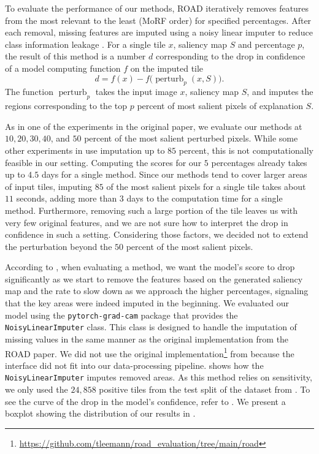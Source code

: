 To evaluate the performance of our methods, ROAD iteratively removes features from the most relevant to the least (MoRF order) for specified percentages.
After each removal, missing features are imputed using a noisy linear imputer to reduce class information leakage \cite{road}.
For a single tile $x$, saliency map $S$ and percentage $p$, the result of this method is a number $d$ corresponding to the drop in confidence of a model computing function $f$ on the imputed tile
\begin{equation}
    d = f(x) - f\bigl(\operatorname{perturb}_p(x, S)\bigr).
\end{equation}
The function $\operatorname{perturb}_p$ takes the input image $x$, saliency map $S$, and imputes the regions corresponding to the top $p$ percent of most salient pixels of explanation $S$.

As in one of the experiments in the original paper, we evaluate our methods at $10, 20, 30, 40$, and $50$ percent of the most salient perturbed pixels.
While some other experiments in \cite{road} use imputation up to $85$ percent, this is not computationally feasible in our setting.
Computing the scores for our $5$ percentages already takes up to $4.5$ days for a single method.
Since our methods tend to cover larger areas of input tiles, imputing $85$ of the most salient pixels for a single tile takes about $11$ seconds, adding more than $3$ days to the computation time for a single method.
Furthermore, removing such a large portion of the tile leaves us with very few original features, and we are not sure how to interpret the drop in confidence in such a setting.
Considering those factors, we decided not to extend the perturbation beyond the $50$ percent of the most salient pixels.

According to \cite{road}, when evaluating a method, we want the model's score to drop significantly as we start to remove the features based on the generated saliency map and the rate to slow down as we approach the higher percentages, signaling that the key areas were indeed imputed in the beginning.
We evaluated our model using the \texttt{pytorch-grad-cam} package that provides the \texttt{NoisyLinearImputer} class.
This class is designed to handle the imputation of missing values in the same manner as the original implementation from the ROAD paper.
We did not use the original implementation\footnote{\url{https://github.com/tleemann/road_evaluation/tree/main/road}} from \cite{road} because the interface did not fit into our data-processing pipeline.
 shows how the \texttt{NoisyLinearImputer} imputes removed areas.
As this method relies on sensitivity, we only used the $24,858$ positive tiles from the test split of the dataset from .
To see the curve of the drop in the model's confidence, refer to .
We present a boxplot showing the distribution of our results in .


